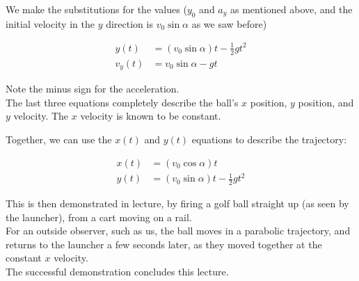We make the substitutions for the values ($y_0$ and $a_y$ as mentioned above, and the initial velocity in the $y$ direction is $v_0 \sin \alpha$ as we saw before)

\begin{align}
y(t) &= (v_0 \sin \alpha) t - \frac{1}{2} g t^2\\
v_y(t) &= v_0 \sin \alpha - g t
\end{align}

Note the minus sign for the acceleration.\\
The last three equations completely describe the ball's $x$ position, $y$ position, and $y$ velocity. The $x$ velocity is known to be constant.

Together, we can use the $x(t)$ and $y(t)$ equations to describe the trajectory:

\begin{align*}
x(t) &= (v_0 \cos \alpha) t\\
y(t) &= (v_0 \sin \alpha) t - \frac{1}{2} g t^2
\end{align*}

This is then demonstrated in lecture, by firing a golf ball straight up (as seen by the launcher), from a cart moving on a rail.\\
For an outside observer, such as us, the ball moves in a parabolic trajectory, and returns to the launcher a few seconds later, as they moved together at the constant $x$ velocity.\\
The successful demonstration concludes this lecture.

